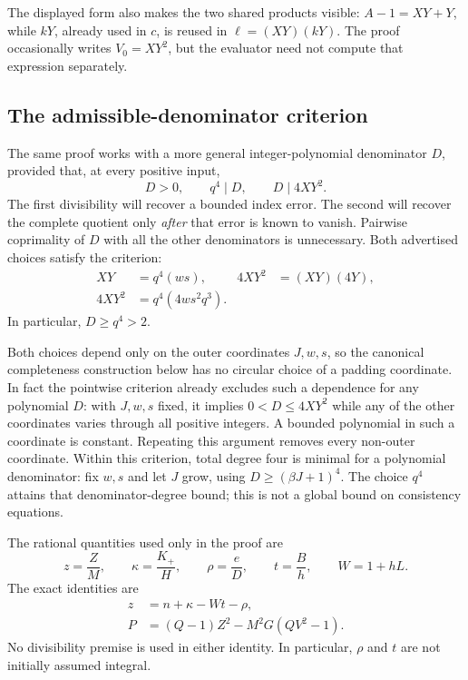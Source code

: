 The displayed form also makes the two shared products visible:
\(A-1=XY+Y\), while \(kY\), already used in \(c\), is reused in
\(\ell=(XY)(kY)\).  The proof occasionally writes \(V_0=XY^2\), but
the evaluator need not compute that expression separately.

\subsection{The admissible-denominator criterion}
\label{subsec:compact-denominator}

The same proof works with a more general integer-polynomial denominator
\(D\), provided that, at every positive input,
\begin{equation}
 D>0,\qquad q^4\mid D,\qquad D\mid4XY^2.
 \label{eq:compact-admissible}
\end{equation}
The first divisibility will recover a bounded index error.  The second
will recover the complete quotient only \emph{after} that error is known
to vanish.  Pairwise coprimality of \(D\) with all the other denominators
is unnecessary.  Both advertised choices satisfy the criterion:
\begin{align*}
 XY&=q^4(ws),&4XY^2&=(XY)(4Y),\\
 4XY^2&=q^4(4ws^2q^3).
\end{align*}
In particular, \(D\ge q^4>2\).

Both choices depend only on the outer coordinates \(J,w,s\), so the
canonical completeness construction below has no circular choice of a
padding coordinate.  In fact the pointwise criterion already excludes
such a dependence for any polynomial \(D\): with \(J,w,s\) fixed, it
implies \(0<D\le4XY^2\) while any of the other coordinates varies through
all positive integers.  A bounded polynomial in such a coordinate is
constant.  Repeating this argument removes every non-outer coordinate.
Within this criterion, total degree four is minimal for a polynomial
denominator: fix \(w,s\) and let \(J\) grow, using \(D\ge(\beta J+1)^4\).
The choice \(q^4\) attains that denominator-degree bound; this is not a
global bound on consistency equations.

The rational quantities used only in the proof are
\[
 z=\frac ZM,\qquad \kappa=\frac{K_+}{H},\qquad
 \rho=\frac eD,\qquad t=\frac Bh,\qquad W=1+hL.
\]
The exact identities are
\begin{align}
 z&=n+\kappa-Wt-\rho,                         \label{eq:compact-rational}\\
 P&=(Q-1)Z^2-M^2G(QV^2-1).                   \label{eq:compact-norm}
\end{align}
No divisibility premise is used in either identity.  In particular,
\(\rho\) and \(t\) are not initially assumed integral.

